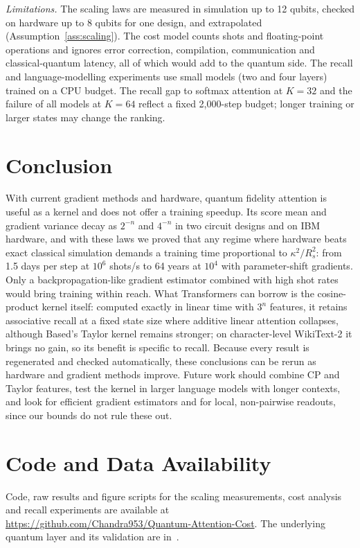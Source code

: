 \documentclass[conference]{IEEEtran}
\theoremstyle{definition}
\begin{document}
\textit{Limitations.} The scaling laws are measured in simulation up to 12 qubits, checked on hardware up to 8 qubits for one design, and extrapolated (Assumption~\ref{ass:scaling}). The cost model counts shots and floating-point operations and ignores error correction, compilation, communication and classical-quantum latency, all of which would add to the quantum side. The recall and language-modelling experiments use small models (two and four layers) trained on a CPU budget. The recall gap to softmax attention at $K=32$ and the failure of all models at $K=64$ reflect a fixed 2{,}000-step budget; longer training or larger states may change the ranking.

\section{Conclusion}

With current gradient methods and hardware, quantum fidelity attention is useful as a kernel and does not offer a training speedup. Its score mean and gradient variance decay as $2^{-n}$ and $4^{-n}$ in two circuit designs and on IBM hardware, and with these laws we proved that any regime where hardware beats exact classical simulation demands a training time proportional to $\kappa^2/R_s^2$: from 1.5 days per step at $10^6$ shots/s to 64 years at $10^4$ with parameter-shift gradients. Only a backpropagation-like gradient estimator combined with high shot rates would bring training within reach. What Transformers can borrow is the cosine-product kernel itself: computed exactly in linear time with $3^n$ features, it retains associative recall at a fixed state size where additive linear attention collapses, although Based's Taylor kernel remains stronger; on character-level WikiText-2 it brings no gain, so its benefit is specific to recall. Because every result is regenerated and checked automatically, these conclusions can be rerun as hardware and gradient methods improve. Future work should combine CP and Taylor features, test the kernel in larger language models with longer contexts, and look for efficient gradient estimators and for local, non-pairwise readouts, since our bounds do not rule these out.

\section*{Code and Data Availability}
Code, raw results and figure scripts for the scaling measurements, cost analysis and recall experiments are available at \url{https://github.com/Chandra953/Quantum-Attention-Cost}.
The underlying quantum layer and its validation are in~\cite{singuru2026fidelity}.
\end{document}
